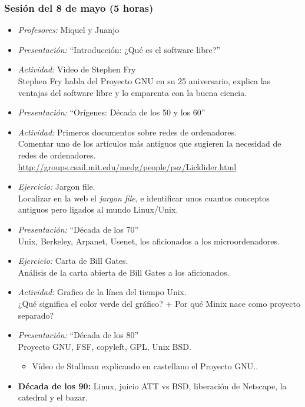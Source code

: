 \documentclass[a4paper,12pt]{article}
\begin{document}
\subsubsection{Sesión del 8 de mayo (5 horas)}

\begin{itemize}
\item \emph{Profesores:} Miquel y Juanjo
\item \emph{Presentación:} ``Introducción: ¿Qué es el software libre?'' 
\item \emph{Actividad:} Video de  Stephen Fry \\
  Stephen Fry habla del Proyecto GNU en su 25 aniversario, explica las ventajas del software libre y lo emparenta con la buena ciencia. 
\item \emph{Presentación:} ``Orígenes: Década de los 50 y los 60''
\item \emph{Actividad:} Primeros documentos sobre redes de ordenadores. \\
  Comentar uno de los artículos más antiguos que sugieren la necesidad de redes de ordenadores. \\
  \url{http://groups.csail.mit.edu/medg/people/psz/Licklider.html}
\item \emph{Ejercicio:} Jargon file. \\
  Localizar en la web el \textit{jargon file}, e identificar unos cuantos conceptos antiguos pero ligados al mundo Linux/Unix. 
\item \emph{Presentación:} ``Década de los 70'' \\
  Unix, Berkeley, Arpanet, Usenet, los aficionados a los microordenadores.
\item \emph{Ejercicio:} Carta de Bill Gates. \\
  Análisis de la carta abierta de Bill Gates a los aficionados.
\item \emph{Actividad:} Grafico de la línea del tiempo Unix. \\
  ¿Qué significa el color verde del gráfico? + Por qué Minix nace como proyecto separado?
\item \emph{Presentación:} ``Década de los 80'' \\
  Proyecto GNU, FSF, copyleft, GPL, Unix BSD.
	\begin{itemize}
	\item Vídeo de Stallman explicando en castellano el Proyecto GNU.. 
	\end{itemize}
\item \textbf{Década de los 90:} Linux, juicio ATT vs BSD, liberación de Netscape, la catedral y el bazar.

\end{itemize}
\end{document}
